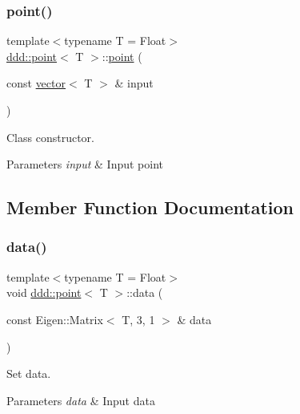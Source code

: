 \subsubsection{\texorpdfstring{point()}{point()}\hspace{0.1cm}{\footnotesize\ttfamily [3/3]}}
{\footnotesize\ttfamily template$<$typename T = Float$>$ \\
\hyperlink{classddd_1_1point}{ddd\+::point}$<$ T $>$\+::\hyperlink{classddd_1_1point}{point} (\begin{DoxyParamCaption}\item[{const \hyperlink{classddd_1_1vector}{vector}$<$ T $>$ \&}]{input }\end{DoxyParamCaption})\hspace{0.3cm}{\ttfamily [inline]}}



Class constructor. 


\begin{DoxyParams}{Parameters}
{\em input} & Input point \\
\hline
\end{DoxyParams}


\subsection{Member Function Documentation}
\mbox{\label{classddd_1_1point_a8bc0f2072cb816a9a4128220fb4438af}} 
\subsubsection{\texorpdfstring{data()}{data()}}
{\footnotesize\ttfamily template$<$typename T = Float$>$ \\
void \hyperlink{classddd_1_1point}{ddd\+::point}$<$ T $>$\+::data (\begin{DoxyParamCaption}\item[{const Eigen\+::\+Matrix$<$ T, 3, 1 $>$ \&}]{data }\end{DoxyParamCaption})\hspace{0.3cm}{\ttfamily [inline]}}



Set data. 


\begin{DoxyParams}{Parameters}
{\em data} & Input data \\
\hline
\end{DoxyParams}
\mbox{\label{classddd_1_1point_a59d8714cc178090ddf75b0c9dbd832c9}} 
